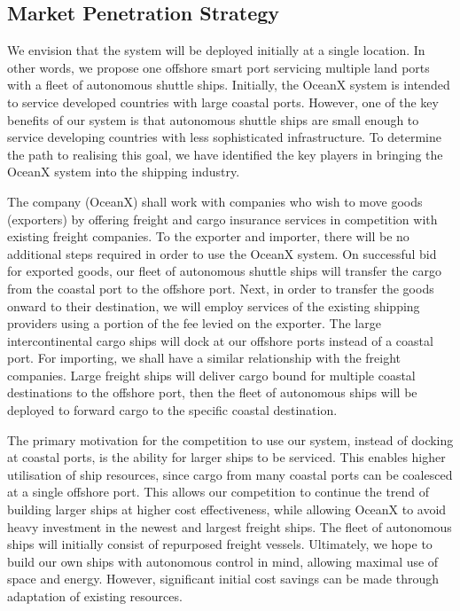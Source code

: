 \subsection{Market Penetration Strategy}

We envision that the system will be  deployed initially at a single location. In other words, we propose one offshore smart port servicing multiple land ports with a fleet of autonomous shuttle ships. Initially, the OceanX system is intended to service developed countries with large coastal ports. However, one of the key benefits of our system is that autonomous shuttle ships are small enough to service developing countries with less sophisticated infrastructure. To determine the path to realising this goal, we have identified the key players in bringing the OceanX system into the shipping industry. 

The company (OceanX) shall work with companies who wish to move goods (exporters) by offering freight and cargo insurance services in competition with existing freight companies. To the exporter and importer, there will be no additional steps required in order to use the OceanX system. On successful bid for exported goods, our fleet of autonomous shuttle ships will transfer the cargo from the coastal port to the offshore port. Next, in order to transfer the goods onward to their destination, we will employ services of the existing shipping providers  using a portion of the fee levied on the exporter. The large intercontinental cargo ships will dock at our offshore ports instead of a coastal port. For importing, we shall have a similar relationship with the freight companies. Large freight ships will deliver cargo bound for multiple coastal destinations to the offshore port, then the fleet of autonomous ships will be deployed to forward cargo to the specific coastal destination.

The primary motivation for the competition to use our system, instead of docking at coastal ports, is the ability for larger ships to be serviced. This enables higher utilisation of ship resources, since cargo from many coastal ports can be coalesced at a single offshore port. This allows our competition to continue the trend of building larger ships at higher cost effectiveness, while allowing OceanX to avoid heavy investment in the newest and largest freight ships. The fleet of autonomous ships will initially consist of repurposed freight vessels.  Ultimately, we hope to build our own ships with autonomous control in mind, allowing maximal use of space and energy. However, significant initial cost savings can be made through adaptation of existing resources. 

